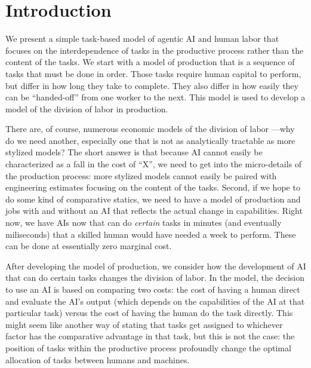 \documentclass{article}
\theoremstyle{plain}
\theoremstyle{plain}
\begin{document}
\section{Introduction}
We present a simple task-based model of agentic AI and human labor that focuses on the interdependence of tasks in the productive process rather than the content of the tasks.
We start with a model of production that is a sequence of tasks that must be done in order.
Those tasks require human capital to perform, but differ in how long they take to complete.
They also differ in how easily they can be ``handed-off'' from one worker to the next.
This model is used to develop a model of the division of labor in production.

There are, of course, numerous economic models of the division of labor \citep{becker1992division, deming2017growing}---why do we need another, especially one that is not as analytically tractable as more stylized models?
The short answer is that because AI cannot easily be characterized as a fall in the cost of ``X'', we need to get into the micro-details of the production process: more stylized models cannot easily be paired with engineering estimates focusing on the content of the tasks. 
Second, if we hope to do some kind of comparative statics, we need to have a model of production and jobs with and without an AI that reflects the actual change in capabilities.
Right now, we have AIs now that can do \emph{certain} tasks in minutes (and eventually miliseconds) that a skilled human would have needed a week to perform. 
These can be done at essentially zero marginal cost. 

After developing the model of production, we consider how the development of AI that can do certain tasks changes the division of labor.
In the model, the decision to use an AI is based on comparing two costs: the cost of having a human direct and evaluate the AI's output (which depends on the capabilities of the AI at that particular task) versus the cost of having the human do the task directly.
This might seem like another way of stating that tasks get assigned to whichever factor has the comparative advantage in that task, but this is not the case: the position of tasks within the productive process profoundly change the optimal allocation of tasks between humans and machines.
\end{document}
